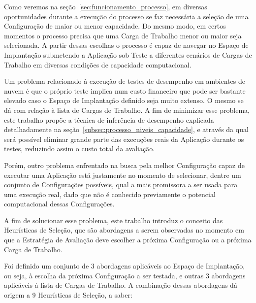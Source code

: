 Como veremos na seção~\ref{sec:funcionamento_processo}, em diversas oportunidades
durante a execução do processo se faz necessária a seleção de uma Configuração de
maior ou menor capacidade. Do mesmo modo, em certos momentos o processo precisa
que uma Carga de Trabalho menor ou maior seja selecionada. A partir dessas escolhas
o processo é capaz de navegar no Espaço de Implantação submetendo a Aplicação sob
Teste a diferentes cenários de Cargas de Trabalho em diversas condições de capacidade
computacional.

Um problema relacionado à execução de testes de desempenho em ambientes de nuvem
é que o próprio teste implica num custo financeiro que pode ser bastante elevado
caso o Espaço de Implantação definido seja muito extenso. O mesmo se dá com 
relação à lista de Cargas de Trabalho. A fim de minimizar esse problema, este
trabalho propõe a técnica de inferência de desempenho explicada
detalhadamente na seção~\ref{subsec:processo_niveis_capacidade}, e através da
qual será possível eliminar grande parte das execuções reais da Aplicação
durante os testes, reduzindo assim o custo total da avaliação.

Porém, outro problema enfrentado na busca pela melhor Configuração capaz de executar 
uma Aplicação está justamente no momento de selecionar, dentre um conjunto de 
Configurações possíveis, qual a mais promissora a ser usada para uma execução real, 
dado que não é conhecido previamente o potencial computacional dessas Configurações.

A fim de solucionar esse problema, este trabalho introduz o conceito das 
Heurísticas de Seleção, que são abordagens a serem observadas no momento em que
a Estratégia de Avaliação deve escolher a próxima Configuração ou a próxima Carga 
de Trabalho. 

Foi definido um conjunto de 3 abordagens aplicáveis ao Espaço de Implantação,
ou seja, à escolha da próxima Configuração a ser testada, e outras 3 abordagens
aplicáveis à lista de Cargas de Trabalho. A combinação dessas abordagens dá origem
a 9 Heurísticas de Seleção, a saber:


